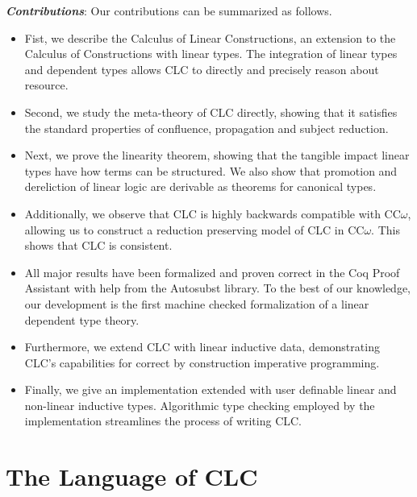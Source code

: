 \documentclass[sigplan,screen,review,authordraft]{acmart}
\theoremstyle{definition}
\begin{document}
  \noindent \textbf{\textit{Contributions}}: 
  Our contributions can be summarized as follows.
  \begin{itemize}
    \item Fist, we describe the Calculus of Linear Constructions, an extension to the Calculus of Constructions with linear types. The integration of linear types and dependent types allows CLC to directly and precisely reason about resource.
    \item Second, we study the meta-theory of CLC directly, showing that it satisfies the standard properties of confluence, propagation and subject reduction.
    \item Next, we prove the linearity theorem, showing that the tangible impact linear types have how terms can be structured. We also show that promotion and dereliction of linear logic are derivable as theorems for canonical types.
    \item Additionally, we observe that CLC is highly backwards compatible with CC$\omega$, allowing us to construct a reduction preserving model of CLC in CC$\omega$. This shows that CLC is consistent.
    \item All major results have been formalized and proven correct in the Coq Proof Assistant with help from the Autosubst \cite{autosubst} library. To the best of our knowledge, our development is the first machine checked formalization of a linear dependent type theory.
    \item Furthermore, we extend CLC with linear inductive data, demonstrating CLC's capabilities for correct by construction imperative programming.
    \item Finally, we give an implementation extended with user definable linear and non-linear inductive types. Algorithmic type checking employed by the implementation streamlines the process of writing CLC.
  \end{itemize}

  \section{The Language of CLC}
\end{document}
